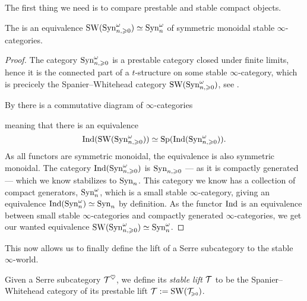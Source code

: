 The first thing we need is to compare prestable and stable compact objects. 

\begin{theorem}
    \label{ch3:add:thm:prestable-freyd-stabilizes-to-stable-Freyd}
    The is an equivalence $\operatorname{SW}(\mathrm{Syn}_{n, \geqslant 0}^\omega)\simeq \mathrm{Syn}_{n}^\omega$ of symmetric monoidal stable $\infty$-categories.  
\end{theorem}
\begin{proof}
    The category $\mathrm{Syn}_{n, \geqslant 0}^\omega$ is a prestable category closed under finite limits, hence it is the connected part of a $t$-structure on some stable $\infty$-category, which is precicely the Spanier--Whitehead category $\operatorname{SW}(\mathrm{Syn}_{n, \geqslant 0}^\omega)$, see \cite[C.1.1, C.1.2]{lurie_SAG}. 

    By \cite[C.1.1.6]{lurie_SAG} there is a commutative diagram of $\infty$-categories
    \begin{center}
    \end{center}
    meaning that there is an equivalence
    \[\operatorname{Ind}(\operatorname{SW}(\mathrm{Syn}_{n, \geqslant 0}^\omega))\simeq \mathrm{Sp}(\operatorname{Ind}(\mathrm{Syn}_{n, \geqslant 0}^\omega)).\]
    As all functors are symmetric monoidal, the equivalence is also symmetric monoidal. The category $\operatorname{Ind}(\mathrm{Syn}_{n, \geqslant 0}^\omega)$ is $\mathrm{Syn}_{n, \geqslant 0}$ --- as it is compactly generated --- which we know stabilizes to $\mathrm{Syn}_{n}$. This category we know has a collection of compact generators, $\mathrm{Syn}_{n}^\omega$, which is a small stable $\infty$-category, giving an equivalence $\operatorname{Ind}(\mathrm{Syn}_{n}^\omega)\simeq \mathrm{Syn}_{n}$ by definition. As the functor $\operatorname{Ind}$ is an equivalence between small stable $\infty$-categories and compactly generated $\infty$-categories, we get our wanted equivalence $\operatorname{SW}(\mathrm{Syn}_{n, \geqslant 0}^\omega)\simeq \mathrm{Syn}_{n}^\omega$. 
\end{proof}

This now allows us to finally define the lift of a Serre subcategory to the stable $\infty$-world. 

\begin{definition}
    Given a Serre subcategory $\mathcal{T}^\heartsuit$, we define its \emph{stable lift} $\mathcal{T}$ to be the Spanier--Whitehead category of its prestable lift $\mathcal{T}:= \operatorname{SW}(\mathcal{T}_{\hspace{-1pt}\scriptscriptstyle\geqslant 0})$. 
\end{definition}

